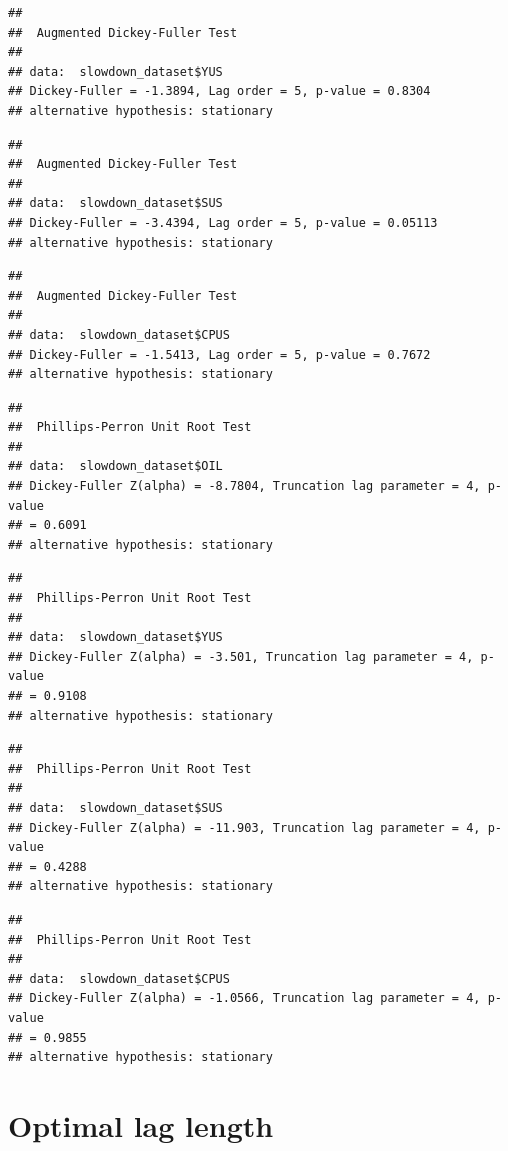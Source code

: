\documentclass[11pt,preprint, authoryear]{elsarticle}
\numberwithin{equation}{section}
\numberwithin{figure}{section}
\numberwithin{table}{section}
\begin{document}
\begin{verbatim}
## 
##  Augmented Dickey-Fuller Test
## 
## data:  slowdown_dataset$YUS
## Dickey-Fuller = -1.3894, Lag order = 5, p-value = 0.8304
## alternative hypothesis: stationary
\end{verbatim}

\begin{verbatim}
## 
##  Augmented Dickey-Fuller Test
## 
## data:  slowdown_dataset$SUS
## Dickey-Fuller = -3.4394, Lag order = 5, p-value = 0.05113
## alternative hypothesis: stationary
\end{verbatim}

\begin{verbatim}
## 
##  Augmented Dickey-Fuller Test
## 
## data:  slowdown_dataset$CPUS
## Dickey-Fuller = -1.5413, Lag order = 5, p-value = 0.7672
## alternative hypothesis: stationary
\end{verbatim}

\begin{verbatim}
## 
##  Phillips-Perron Unit Root Test
## 
## data:  slowdown_dataset$OIL
## Dickey-Fuller Z(alpha) = -8.7804, Truncation lag parameter = 4, p-value
## = 0.6091
## alternative hypothesis: stationary
\end{verbatim}

\begin{verbatim}
## 
##  Phillips-Perron Unit Root Test
## 
## data:  slowdown_dataset$YUS
## Dickey-Fuller Z(alpha) = -3.501, Truncation lag parameter = 4, p-value
## = 0.9108
## alternative hypothesis: stationary
\end{verbatim}

\begin{verbatim}
## 
##  Phillips-Perron Unit Root Test
## 
## data:  slowdown_dataset$SUS
## Dickey-Fuller Z(alpha) = -11.903, Truncation lag parameter = 4, p-value
## = 0.4288
## alternative hypothesis: stationary
\end{verbatim}

\begin{verbatim}
## 
##  Phillips-Perron Unit Root Test
## 
## data:  slowdown_dataset$CPUS
## Dickey-Fuller Z(alpha) = -1.0566, Truncation lag parameter = 4, p-value
## = 0.9855
## alternative hypothesis: stationary
\end{verbatim}

\hypertarget{optimal-lag-length}{%
\section{Optimal lag length}\label{optimal-lag-length}}
\end{document}
